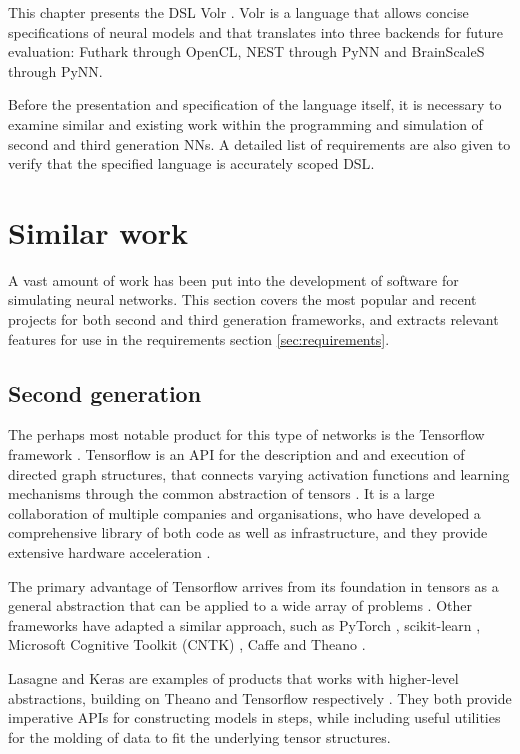 \documentclass[report.tex]{subfiles}
\begin{document}
This chapter presents the \gls{DSL} Volr .
Volr is a language that allows concise specifications of 
neural models and that translates
into three backends for future evaluation:
Futhark  through \gls{OpenCL},
NEST  through PyNN  and BrainScaleS
 through PyNN.

Before the presentation and specification of the language itself, 
it is necessary to examine similar and existing work
within the programming and simulation of second and third generation
\gls{NN}s.
A detailed list of requirements are also given to verify that the
specified language is accurately scoped 
\gls{DSL}.

\section{Similar work}
A vast amount of work has been put into the development of software for simulating
neural networks.
This section covers the most popular and recent projects for both second and third
generation frameworks, and extracts relevant
features for use in the requirements section \ref{sec:requirements}.

\subsection{Second generation}
The perhaps most notable product for this type of networks is the Tensorflow 
framework \cite{Abadi2016}.
Tensorflow is an \gls{API} for the description and and execution of directed graph 
structures,
that connects varying activation functions and learning mechanisms through the common abstraction
of tensors \cite{Abadi2015}.
It is a large collaboration of multiple companies and organisations, who have
developed a comprehensive library of both code as well as infrastructure, and they
provide extensive hardware acceleration \cite{Abadi2015}.

The primary advantage of Tensorflow  arrives from 
its foundation in tensors as a general abstraction that
can be applied to a wide array of problems \cite{Abadi2016}.
Other frameworks have adapted a similar approach, such as PyTorch \cite{PyTorch2018}, 
scikit-learn \cite{Sklearn2018}, Microsoft Cognitive Toolkit (CNTK) \cite{CNTK2018},
Caffe \cite{Caffe2018} and Theano \cite{Theano2018}.

Lasagne and Keras are examples of products that works with higher-level abstractions,
building on Theano and Tensorflow respectively \cite{Lasagne2018, Keras2018}.
They both provide imperative \gls{API}s for constructing models in steps, while
including useful utilities for the molding of data to fit the underlying tensor structures.
\end{document}
